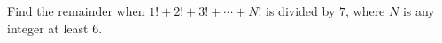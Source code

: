 Find the remainder when $1!+2!+3!+\cdots+N!$ is divided by $7$, where $N$ is any integer at least $6$.
